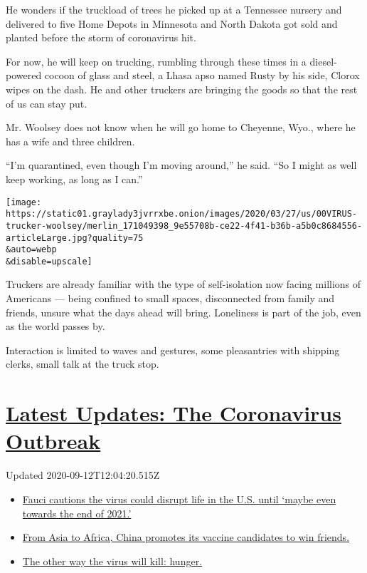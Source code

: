 He wonders if the truckload of trees he picked up at a Tennessee nursery
and delivered to five Home Depots in Minnesota and North Dakota got sold
and planted before the storm of coronavirus hit.

For now, he will keep on trucking, rumbling through these times in a
diesel-powered cocoon of glass and steel, a Lhasa apso named Rusty by
his side, Clorox wipes on the dash. He and other truckers are bringing
the goods so that the rest of us can stay put.

Mr. Woolsey does not know when he will go home to Cheyenne, Wyo., where
he has a wife and three children.

``I'm quarantined, even though I'm moving around,'' he said. ``So I
might as well keep working, as long as I can.''

\texttt{[image: https://static01.graylady3jvrrxbe.onion/images/2020/03/27/us/00VIRUS-trucker-woolsey/merlin\_171049398\_9e55708b-ce22-4f41-b36b-a5b0c8684556-articleLarge.jpg?quality=75\\\&auto=webp\\\&disable=upscale]}

Truckers are already familiar with the type of self-isolation now facing
millions of Americans --- being confined to small spaces, disconnected
from family and friends, unsure what the days ahead will bring.
Loneliness is part of the job, even as the world passes by.

Interaction is limited to waves and gestures, some pleasantries with
shipping clerks, small talk at the truck stop.

\hypertarget{latest-updates-the-coronavirus-outbreak}{%
\section{\texorpdfstring{\href{https://www.nytimes3xbfgragh.onion/2020/09/11/world/covid-19-coronavirus.html?action=click\&pgtype=Article\&state=default\&region=MAIN_CONTENT_1\&context=storylines_live_updates}{Latest
Updates: The Coronavirus
Outbreak}}{Latest Updates: The Coronavirus Outbreak}}\label{latest-updates-the-coronavirus-outbreak}}

Updated 2020-09-12T12:04:20.515Z

\begin{itemize}
\tightlist
\item
  \href{https://www.nytimes3xbfgragh.onion/2020/09/11/world/covid-19-coronavirus.html?action=click\&pgtype=Article\&state=default\&region=MAIN_CONTENT_1\&context=storylines_live_updates\#link-dfb8a16}{Fauci
  cautions the virus could disrupt life in the U.S. until `maybe even
  towards the end of 2021.'}
\item
  \href{https://www.nytimes3xbfgragh.onion/2020/09/11/world/covid-19-coronavirus.html?action=click\&pgtype=Article\&state=default\&region=MAIN_CONTENT_1\&context=storylines_live_updates\#link-7104d154}{From
  Asia to Africa, China promotes its vaccine candidates to win friends.}
\item
  \href{https://www.nytimes3xbfgragh.onion/2020/09/11/world/covid-19-coronavirus.html?action=click\&pgtype=Article\&state=default\&region=MAIN_CONTENT_1\&context=storylines_live_updates\#link-393ad215}{The
  other way the virus will kill: hunger.}
\end{itemize}

